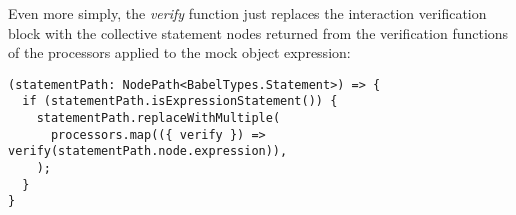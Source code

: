 Even more simply,
the \textit{verify} function just replaces the interaction verification block
with the collective statement nodes returned from
the verification functions of the processors
applied to the mock object expression:
\begin{verbatim}
(statementPath: NodePath<BabelTypes.Statement>) => {
  if (statementPath.isExpressionStatement()) {
    statementPath.replaceWithMultiple(
      processors.map(({ verify }) => verify(statementPath.node.expression)),
    );
  }
}
\end{verbatim}
